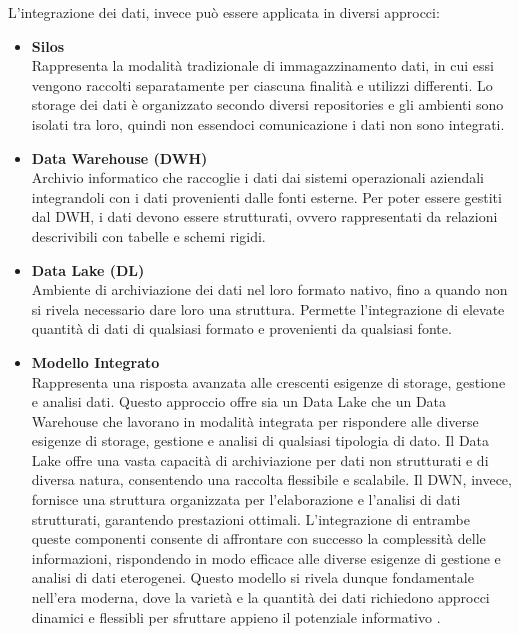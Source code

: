 L'integrazione dei dati, invece può essere applicata in diversi approcci:
\begin{itemize}
    \item \textbf{Silos}\\
    Rappresenta la modalità tradizionale di immagazzinamento dati, in cui essi vengono raccolti separatamente per ciascuna finalità e utilizzi differenti. Lo storage dei dati è organizzato secondo diversi repositories e gli ambienti sono isolati tra loro, quindi non essendoci comunicazione i dati non sono integrati.
    \item \textbf{Data Warehouse (DWH)}\\
    Archivio informatico che raccoglie i dati dai sistemi operazionali aziendali integrandoli con i dati provenienti dalle fonti esterne. Per poter essere gestiti dal DWH, i dati devono essere strutturati, ovvero rappresentati da relazioni descrivibili con tabelle e schemi rigidi.
    \item \textbf{Data Lake (DL)}\\
    Ambiente di archiviazione dei dati nel loro formato nativo, fino a quando non si rivela necessario dare loro una struttura. Permette l'integrazione di elevate quantità di dati di qualsiasi formato e provenienti da qualsiasi fonte.
    \item \textbf{Modello Integrato}\\
    Rappresenta una risposta avanzata alle crescenti esigenze di storage, gestione e analisi dati. Questo approccio offre sia un Data Lake che un Data Warehouse che lavorano in modalità integrata per rispondere alle diverse esigenze di storage, gestione e analisi di qualsiasi tipologia di dato. Il Data Lake offre una vasta capacità di archiviazione per dati non strutturati e di diversa natura, consentendo una raccolta flessibile e scalabile. Il DWN, invece, fornisce una struttura organizzata per l'elaborazione e l'analisi di dati strutturati, garantendo prestazioni ottimali. L'integrazione di entrambe queste componenti consente di affrontare con successo la complessità delle informazioni, rispondendo in modo efficace alle diverse esigenze di gestione e analisi di dati eterogenei. Questo modello si rivela dunque fondamentale nell'era moderna, dove la varietà e la quantità dei dati richiedono approcci dinamici e flessibli per sfruttare appieno il potenziale informativo \cite{Data_Integration}.
\end{itemize}



